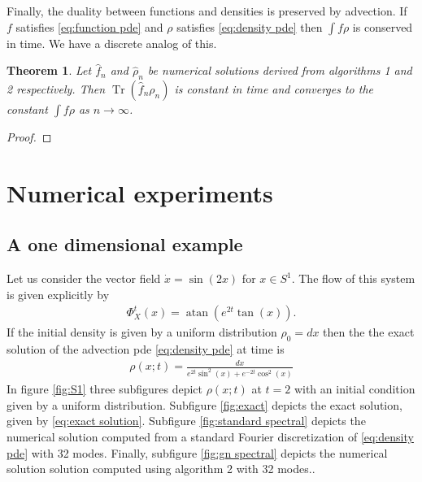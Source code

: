 \documentclass[12pt]{amsart}
\newtheorem{thm}{Theorem}[section]
\DeclareMathOperator{\Tr}{Tr}
\begin{document}
Finally, the duality between functions and densities is preserved by advection.  If $f$ satisfies \eqref{eq:function pde} and $\rho $ satisfies \eqref{eq:density pde} then $\int f \rho$ is conserved in time.
We have a discrete analog of this.
\begin{thm}
	Let $\hat{f}_{n}$ and $\hat{\rho}_{n}$ be numerical solutions derived from algorithms 1 and 2 respectively.
	Then $\Tr( \hat{f}_{n} \rho_{n} )$ is constant in time and converges to the constant $\int f \rho$ as $n \to \infty$.
\end{thm}
\begin{proof}
\end{proof}


\section{Numerical experiments}

\subsection{A one dimensional example}
Let us consider the vector field $\dot{x} = \sin(2x)$ for $x \in S^{1}$.
The flow of this system is given explicitly by
\begin{align*}
	\Phi_{X}^{t}(x) = \operatorname{atan} \left( e^{2t} \tan(x) \right).
\end{align*}
If the initial density is given by a uniform distribution $\rho_{0} = dx$ then the the exact solution of the advection pde \eqref{eq:density pde} at time is
\begin{align}
	\rho(x;t) =  \frac{dx}{e^{2t} \sin^{2}(x) + e^{-2t} \cos^{2}(x) } \label{eq:exact solution}
\end{align}
 In figure \ref{fig:S1} three subfigures depict $\rho(x;t)$ at $t=2$ with an initial condition given by a uniform distribution.
Subfigure \ref{fig:exact} depicts the exact solution, given by \eqref{eq:exact solution}.  Subfigure \ref{fig:standard spectral} depicts the numerical solution computed
from a standard Fourier discretization of \eqref{eq:density pde} with 32 modes.
Finally, subfigure \ref{fig:gn spectral} depicts the numerical solution solution computed using algorithm 2 with 32 modes..
\end{document}
